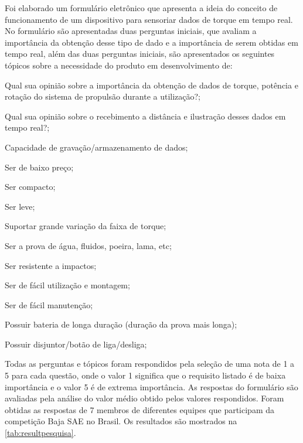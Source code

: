 Foi elaborado um formulário eletrônico que apresenta a ideia do conceito de funcionamento de um dispositivo para sensoriar dados de torque em tempo real.
No formulário são apresentadas duas perguntas iniciais, que avaliam a importância da obtenção desse tipo de dado e a importância de serem obtidas em tempo real, além das duas perguntas
iniciais, são apresentados os seguintes tópicos sobre a necessidade do produto em desenvolvimento de:

\begin{alineas}

	\item Qual sua opinião sobre a importância da obtenção de dados de torque, potência e rotação do sistema de propulsão durante a utilização?;
	\item Qual sua opinião sobre o recebimento a distância e ilustração desses dados em tempo real?;
	\item Capacidade de gravação/armazenamento de dados;
	\item Ser de baixo preço;
	\item Ser compacto;
	\item Ser leve;
	\item Suportar grande variação da faixa de torque;
	\item Ser a prova de água, fluidos, poeira, lama, etc;
	\item Ser resistente a impactos;
	\item Ser de fácil utilização e montagem;
	\item Ser de fácil manutenção;
	\item Possuir bateria de longa duração (duração da prova mais longa);
	\item Possuir disjuntor/botão de liga/desliga;

\end{alineas}

Todas as perguntas e tópicos foram respondidos pela seleção de uma nota de 1 a 5 para cada questão, onde o valor 1 significa que o requisito listado é de baixa importância e
o valor 5 é de extrema importância.
As respostas do formulário são avaliadas pela análise do valor médio obtido pelos valores respondidos.
Foram obtidas as respostas de 7 membros de diferentes equipes que participam da competição Baja SAE no Brasil.
Os resultados são mostrados na \autoref{tab:resultpesquisa}.

